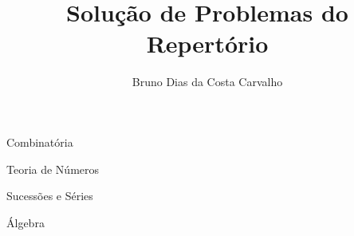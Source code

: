 \documentclass[11pt,a4paper]{article}
\title{Solução de Problemas do Repertório}
\author{Bruno Dias da Costa Carvalho}
\begin{document}
\maketitle
\tableofcontents
\clearpage

\begin{problemset}{Combinatória}

\clearpage


\clearpage
\end{problemset}

\begin{problemset}{Teoria de Números}

\clearpage


\clearpage


\clearpage


\clearpage


\clearpage
\end{problemset}

\begin{problemset}{Sucessões e Séries}

\clearpage
\end{problemset}

\begin{problemset}{Álgebra}

\clearpage


\clearpage
\end{problemset}
\end{document}

